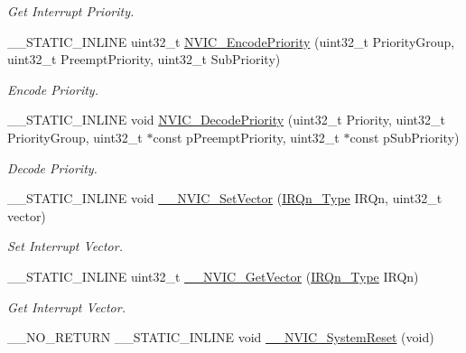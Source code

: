 \begin{DoxyCompactItemize}
\begin{DoxyCompactList}\small\item\em Get Interrupt Priority. \end{DoxyCompactList}\item 
\+\_\+\+\_\+\+S\+T\+A\+T\+I\+C\+\_\+\+I\+N\+L\+I\+NE uint32\+\_\+t \hyperlink{group___c_m_s_i_s___core___n_v_i_c_functions_gadb94ac5d892b376e4f3555ae0418ebac}{N\+V\+I\+C\+\_\+\+Encode\+Priority} (uint32\+\_\+t Priority\+Group, uint32\+\_\+t Preempt\+Priority, uint32\+\_\+t Sub\+Priority)
\begin{DoxyCompactList}\small\item\em Encode Priority. \end{DoxyCompactList}\item 
\+\_\+\+\_\+\+S\+T\+A\+T\+I\+C\+\_\+\+I\+N\+L\+I\+NE void \hyperlink{group___c_m_s_i_s___core___n_v_i_c_functions_ga3387607fd8a1a32cccd77d2ac672dd96}{N\+V\+I\+C\+\_\+\+Decode\+Priority} (uint32\+\_\+t Priority, uint32\+\_\+t Priority\+Group, uint32\+\_\+t $\ast$const p\+Preempt\+Priority, uint32\+\_\+t $\ast$const p\+Sub\+Priority)
\begin{DoxyCompactList}\small\item\em Decode Priority. \end{DoxyCompactList}\item 
\+\_\+\+\_\+\+S\+T\+A\+T\+I\+C\+\_\+\+I\+N\+L\+I\+NE void \hyperlink{group___c_m_s_i_s___core___n_v_i_c_functions_ga0df355460bc1783d58f9d72ee4884208}{\+\_\+\+\_\+\+N\+V\+I\+C\+\_\+\+Set\+Vector} (\hyperlink{group___peripheral__interrupt__number__definition_ga7e1129cd8a196f4284d41db3e82ad5c8}{I\+R\+Qn\+\_\+\+Type} I\+R\+Qn, uint32\+\_\+t vector)
\begin{DoxyCompactList}\small\item\em Set Interrupt Vector. \end{DoxyCompactList}\item 
\+\_\+\+\_\+\+S\+T\+A\+T\+I\+C\+\_\+\+I\+N\+L\+I\+NE uint32\+\_\+t \hyperlink{group___c_m_s_i_s___core___n_v_i_c_functions_ga44b665d2afb708121d9b10c76ff00ee5}{\+\_\+\+\_\+\+N\+V\+I\+C\+\_\+\+Get\+Vector} (\hyperlink{group___peripheral__interrupt__number__definition_ga7e1129cd8a196f4284d41db3e82ad5c8}{I\+R\+Qn\+\_\+\+Type} I\+R\+Qn)
\begin{DoxyCompactList}\small\item\em Get Interrupt Vector. \end{DoxyCompactList}\item 
\+\_\+\+\_\+\+N\+O\+\_\+\+R\+E\+T\+U\+RN \+\_\+\+\_\+\+S\+T\+A\+T\+I\+C\+\_\+\+I\+N\+L\+I\+NE void \hyperlink{group___c_m_s_i_s___core___n_v_i_c_functions_ga0d9aa2d30fa54b41eb780c16e35b676c}{\+\_\+\+\_\+\+N\+V\+I\+C\+\_\+\+System\+Reset} (void)

\end{DoxyCompactItemize}

